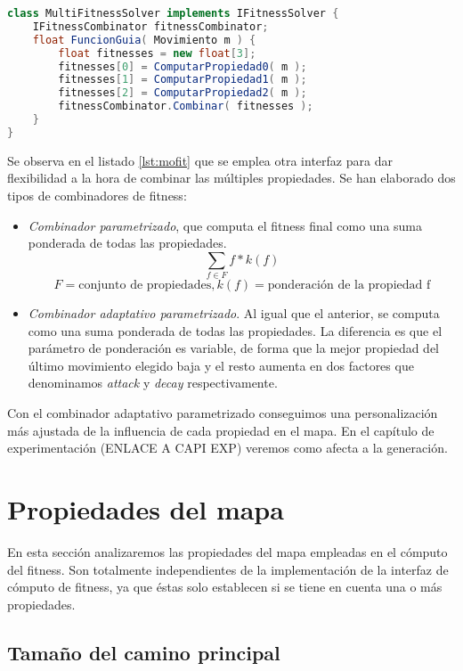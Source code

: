 \begin{lstlisting}[caption={Interfaz de selección de movimiento basada en búsqueda},label={lst:igsf},language=Java,escapechar=|]
class MultiFitnessSolver implements IFitnessSolver {
	IFitnessCombinator fitnessCombinator;
	float FuncionGuia( Movimiento m ) {
		float fitnesses = new float[3];
		fitnesses[0] = ComputarPropiedad0( m );
		fitnesses[1] = ComputarPropiedad1( m );
		fitnesses[2] = ComputarPropiedad2( m );
		fitnessCombinator.Combinar( fitnesses );
	}
}
\end{lstlisting}

Se observa en el listado \ref{lst:mofit} que se emplea otra interfaz para dar flexibilidad a la hora de combinar las múltiples propiedades. Se han elaborado dos tipos de combinadores de fitness:

\begin{itemize}
	\item \emph{Combinador parametrizado}, que computa el fitness final como una suma ponderada de todas las propiedades.
		$$ \sum_{f \in F} f * k(f)$$
		$$F = \text{conjunto de propiedades}, k(f) = \text{ponderación de la propiedad f} $$
	\item \emph{Combinador adaptativo parametrizado}. Al igual que el anterior, se computa como una suma ponderada de todas las propiedades. La diferencia es que el parámetro de ponderación es variable, de forma que la mejor propiedad del último movimiento elegido baja y el resto aumenta en dos factores que denominamos \emph{attack} y \emph{decay} respectivamente.
\end{itemize}

Con el combinador adaptativo parametrizado conseguimos una personalización más ajustada de la influencia de cada propiedad en el mapa. En el capítulo de experimentación (ENLACE A CAPI EXP) veremos como afecta a la generación.

\section{Propiedades del mapa}

En esta sección analizaremos las propiedades del mapa empleadas en el cómputo del fitness. Son totalmente independientes de la implementación de la interfaz de cómputo de fitness, ya que éstas solo establecen si se tiene en cuenta una o más propiedades.

\subsection{Tamaño del camino principal}

